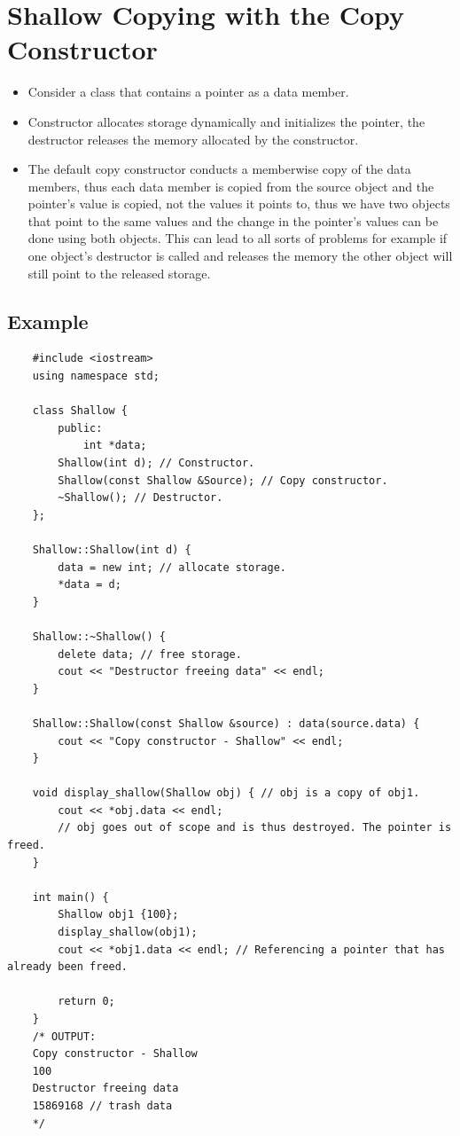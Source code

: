 \section{Shallow Copying with the Copy Constructor}
\begin{itemize}
    \item Consider a class that contains a pointer as a data member.
    \item Constructor allocates storage dynamically and initializes the pointer, the destructor releases the memory allocated by the constructor.
    \item The default copy constructor conducts a memberwise copy of the data members, thus each data member is copied from the source object and the pointer's value is copied, not the values it points to, thus we have two objects that point to the same values and the change in the pointer's values can be done using both objects. This can lead to all sorts of problems for example if one object's destructor is called and releases the memory the other object will still point to the released storage.
\end{itemize}

\subsection{Example}
\begin{verbatim}
    #include <iostream>
    using namespace std;

    class Shallow {
        public:
            int *data;
        Shallow(int d); // Constructor.
        Shallow(const Shallow &Source); // Copy constructor.
        ~Shallow(); // Destructor.
    };

    Shallow::Shallow(int d) {
        data = new int; // allocate storage.
        *data = d;
    }

    Shallow::~Shallow() {
        delete data; // free storage.
        cout << "Destructor freeing data" << endl;
    }

    Shallow::Shallow(const Shallow &source) : data(source.data) {
        cout << "Copy constructor - Shallow" << endl;
    }

    void display_shallow(Shallow obj) { // obj is a copy of obj1.
        cout << *obj.data << endl;
        // obj goes out of scope and is thus destroyed. The pointer is freed.
    }

    int main() {
        Shallow obj1 {100};
        display_shallow(obj1);
        cout << *obj1.data << endl; // Referencing a pointer that has already been freed.

        return 0;
    }
    /* OUTPUT:
    Copy constructor - Shallow
    100
    Destructor freeing data   
    15869168 // trash data
    */
\end{verbatim}

